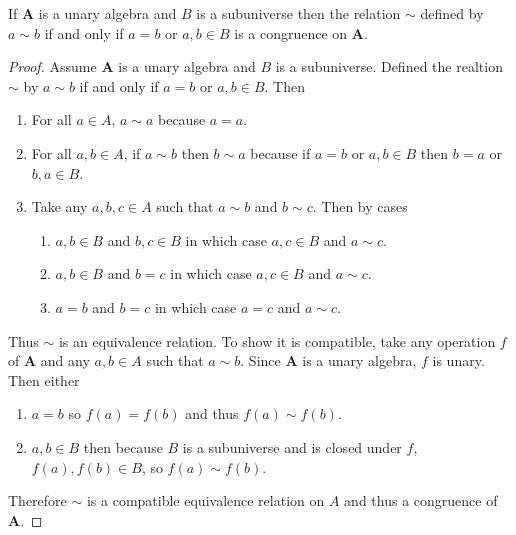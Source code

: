 \begin{theorem*}
  If $\mathbf{A}$ is a unary algebra and $B$ is a subuniverse then the relation $\sim$ defined by $a\sim b$ if and only if $a = b$ or $a, b \in B$ is a congruence on $\mathbf{A}$.
\end{theorem*}

\begin{proof}
  Assume $\mathbf{A}$ is a unary algebra and $B$ is a subuniverse.
  Defined the realtion $\sim$ by $a\sim b$ if and only if $a = b$ or $a, b \in B$.
  Then
  \begin{enumerate}
    \item
      For all $a\in A$, $a\sim a$ because $a = a$.
    \item
      For all $a, b \in A$, if $a \sim b$ then $b\sim a$ because if $a = b$ or $a,b \in B$ then $b = a$ or $b, a \in B$.
    \item
      Take any $a, b, c \in A$ such that $a\sim b$ and $b\sim c$.
      Then by cases
      \begin{enumerate}
        \item $a,b\in B$ and $b, c \in B$ in which case $a, c \in B$ and $a\sim c$.
        \item $a,b\in B$ and $b = c$ in which case $a, c \in B$ and $a \sim c$.
        \item $a = b$ and $b = c$ in which case $a = c$ and $a \sim c$.
      \end{enumerate}
  \end{enumerate}
  Thus $\sim$ is an equivalence relation.
  To show it is compatible, take any operation $f$ of $\mathbf{A}$ and any $a, b \in A$ such that $a \sim b$.
  Since $\mathbf{A}$ is a unary algebra, $f$ is unary.
  Then either
  \begin{enumerate}
    \item
      $a = b$ so $f(a) = f(b)$ and thus $f(a) \sim f(b)$.
    \item
      $a, b \in B$ then because $B$ is a subuniverse and is closed under $f$, $f(a) , f(b) \in B$, so $f(a) \sim f(b)$.
  \end{enumerate}
  Therefore $\sim$ is a compatible equivalence relation on $A$ and thus a congruence of $\mathbf{A}$.
\end{proof}

